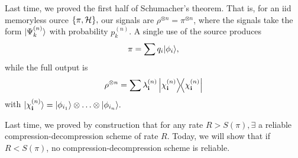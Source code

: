 Last time, we proved the first half of Schumacher's theorem. That is, for an iid memoryless ource $\{\pi,\mathcal H\},$ our signals are $\rho^{\otimes n}=\pi^{\otimes n}$, where the signals take the form $\lvert\Psi_k^{(n)}\rangle$ with probability $p_k^{(n)}$. A single use of the source produces
\begin{equation}
    \pi=\sum q_i \lvert\phi_i\rangle,
\end{equation}
while the full output is
\begin{equation}
    \rho^{\otimes n}=\sum \lambda_{\boldsymbol{\mathbf{i}}}^{(n)} \left\lvert{\chi_{\boldsymbol{\mathbf{i}}}^{(n)}}\middle\rangle\!\middle\langle{\chi_{\boldsymbol{\mathbf{i}}}^{(n)}}\right\rvert
\end{equation}
with $\lvert\chi_{\boldsymbol{\mathbf{i}}}^{(n)}\rangle=\lvert\phi_{i_1}\rangle\otimes \ldots \otimes \lvert\phi_{i_n}\rangle.$

Last time, we proved by construction that for any rate $R>S(\pi), \exists$ a reliable compression-decompression scheme of rate $R$. Today, we will show that if $R<S(\pi)$, no compression-decompression scheme is reliable.
